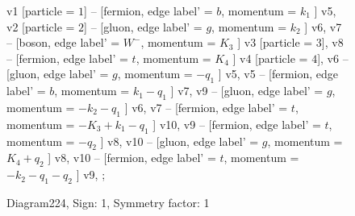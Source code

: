 \documentclass{revtex4}
\begin{document}
\begin{figure}[!htb]
\begin{center}
{    %
v1 [particle = \(1\)] -- [fermion, edge label' = \(b\), momentum = \(k_{1}\) ] v5, 
v2 [particle = \(2\)] -- [gluon, edge label' = \(g\), momentum = \(k_{2}\) ] v6, 
v7 -- [boson, edge label' = \(W^{-}\), momentum = \(K_{3}\) ] v3 [particle = \(3\)], 
v8 -- [fermion, edge label' = \(t\), momentum = \(K_{4}\) ] v4 [particle = \(4\)], 
v6 -- [gluon, edge label' = \(g\), momentum = \(-q_{1}\) ] v5, 
v5 -- [fermion, edge label' = \(b\), momentum = \(k_{1} - q_{1}\) ] v7, 
v9 -- [gluon, edge label' = \(g\), momentum = \(-k_{2} - q_{1}\) ] v6, 
v7 -- [fermion, edge label' = \(t\), momentum = \(-K_{3} + k_{1} - q_{1}\) ] v10, 
v9 -- [fermion, edge label' = \(t\), momentum = \(-q_{2}\) ] v8, 
v10 -- [gluon, edge label' = \(g\), momentum = \(K_{4} + q_{2}\) ] v8, 
v10 -- [fermion, edge label' = \(t\), momentum = \(-k_{2} - q_{1} - q_{2}\) ] v9, 
};
\end{center}
\caption{Diagram224, Sign: 1, Symmetry factor: 1}
\end{figure}
\newpage
\end{document}
